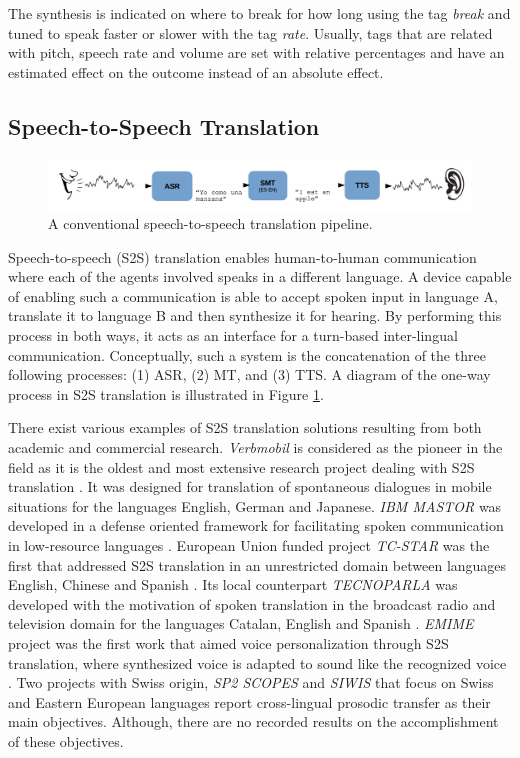 The synthesis is indicated on where to break for how long using the tag \textit{break} and tuned to speak faster or slower with the tag \textit{rate}. Usually, tags that are related with pitch, speech rate and volume are set with relative percentages and have an estimated effect on the outcome instead of an absolute effect. 

\subsection{Speech-to-Speech Translation}
\label{sota:s2s}

\begin{figure}[t]
  \centering
  \includegraphics[width=\linewidth]{img/s2s_classic_pipeline.png}
  \caption{A conventional speech-to-speech translation pipeline.}
  \label{sota:s2s_classic}
\end{figure}

Speech-to-speech (S2S) translation enables human-to-human communication where each of the agents involved speaks in a different language. A device capable of enabling such a communication is able to accept spoken input in language A, translate it to language B and then synthesize it for hearing. By performing this process in both ways, it acts as an interface for a turn-based inter-lingual communication. Conceptually, such a system is the concatenation of the three following processes: (1) ASR, (2) MT, and (3) TTS. A diagram of the one-way process in S2S translation is illustrated in Figure \ref{sota:s2s_classic}. 

There exist various examples of S2S translation solutions resulting from both academic and commercial research. \textit{Verbmobil} is considered as the pioneer in the field as it is the oldest and most extensive research project dealing with S2S translation \citep{wahlster2013verbmobil}. It was designed for translation of spontaneous dialogues in mobile situations for the languages English, German and Japanese. \textit{IBM MASTOR} was developed in a defense oriented framework for facilitating spoken communication in low-resource languages \citep{ibm_mastor}. European Union funded project \textit{TC-STAR} was the first that addressed S2S translation in an unrestricted domain between languages English, Chinese and Spanish \citep{tcstar}. Its local counterpart \textit{TECNOPARLA} was developed with the motivation of spoken translation in the broadcast radio and television domain for the languages Catalan, English and Spanish \citep{tecnoparla}. \textit{EMIME} project was the first work that aimed voice personalization through S2S translation, where synthesized voice is adapted to sound like the recognized voice \citep{emimeemime}. Two projects with Swiss origin, \textit{SP2 SCOPES} \citep{sp2} and \textit{SIWIS} \citep{Garner:199815} that focus on Swiss and Eastern European languages report cross-lingual prosodic transfer as their main objectives. Although, there are no recorded results on the accomplishment of these objectives. 


